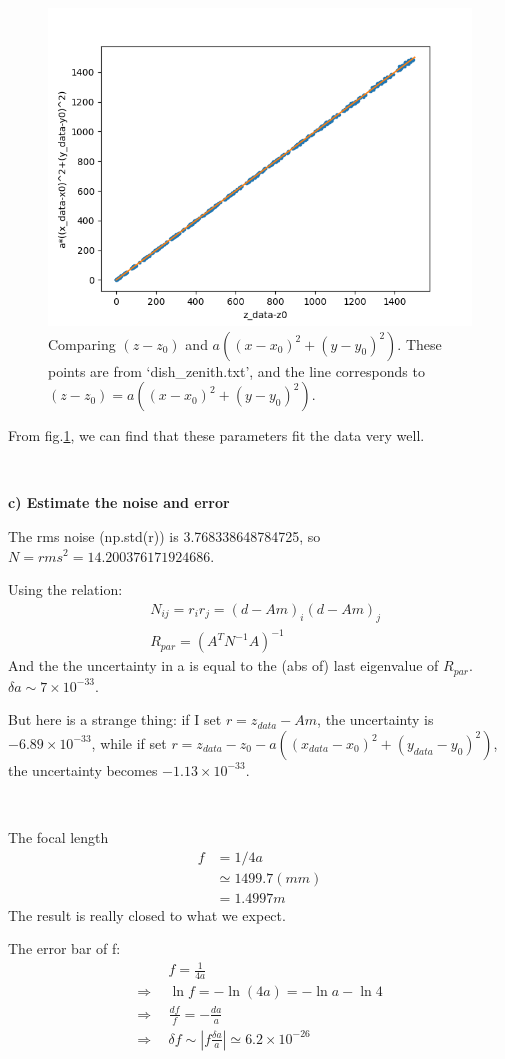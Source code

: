 \documentclass[showpacs, oneside, onecolumn, prl, amsmath, amssymb, nofootinbib, superscriptaddress, notitlepage]{revtex4-1}
\newcommand\bas{\begin{align*}}
\newcommand\bfig{\begin{figure}}
\newcommand\efig{\end{figure}}
\begin{document}
\bfig
	\centering
	\includegraphics[scale=1]{3-1.png}
	\caption{Comparing $(z-z_0)$ and $a((x-x_0)^2+(y-y_0)^2)$. These points are from `dish\_zenith.txt', and the line corresponds to $(z-z_0)=a((x-x_0)^2+(y-y_0)^2)$.}
	\label{3-1}
\efig

From fig.\ref{3-1}, we can find that these parameters fit the data very well.

~~~~

\textbf{c) Estimate the noise and error}

The rms noise (np.std(r)) is 3.768338648784725, so $N=rms^2=14.200376171924686$.

Using the relation:
\bas
&N_{ij}=r_ir_j=(d-Am)_i(d-Am)_j\\
&R_{par}=(A^TN^{-1}A)^{-1}
\end{align*}
And the the uncertainty in a is equal to the (abs of) last eigenvalue of $R_{par}$. $\delta a\sim 7\times 10^{-33}$.

But here is a strange thing: if I set $r=z_{data}-Am$, the uncertainty is $-6.89\times 10^{-33}$, while if set $r=z_{data}-z_0-a((x_{data}-x_0)^2+(y_{data}-y_0)^2)$, the uncertainty becomes $-1.13\times10^{-33}$.

~~~~

The focal length
\bas
f&=1/4a\\
&\simeq 1499.7 (mm)\\
&=1.4997m
\end{align*}
The result is really closed to what we expect.

The error bar of f:
\bas
&f=\frac1{4a}\\
\Rightarrow\ \ &\ln f=-\ln(4a)=-\ln a-\ln4\\
\Rightarrow\ \ &\frac{df}{f}=-\frac{da}{a}\\
\Rightarrow\ \ &\delta f\sim \left|f\frac{\delta a}{a}\right|\simeq 6.2\times10^{-26}
\end{align*}
\end{document}
